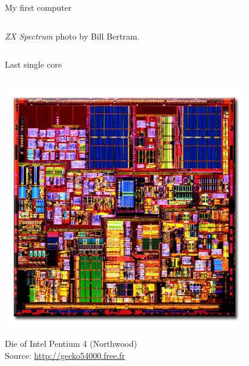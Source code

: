\begin{frame}[t]{My first computer}
\begin{columns}[T]
\begin{column}{.3\textwidth}
    \begin{tiny}
      \emph{ZX Spectrum} photo by Bill Bertram.\\ 
    \end{tiny}
  \end{column}
\end{columns}
\end{frame}


\begin{frame}[t]{Last single core}
\vspace{-1em}
\begin{columns}
  \begin{column}{.15\textwidth}
    \includegraphics[width=\textwidth]{images/intel-p4-die.jpg}\\
    \begin{tiny}
      Die of Intel Pentium 4 (Northwood)\\ 
      Source: \url{http://gecko54000.free.fr}\\
    \end{tiny}
    \vspace{0.75em}
    \begin{center}

\end{center}
\end{column}
\end{columns}
\end{frame}
